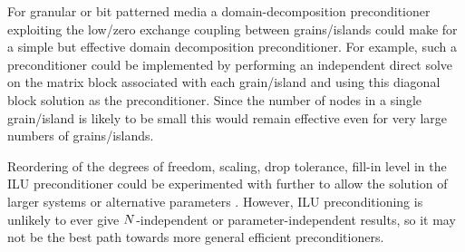 For granular or bit patterned media a domain-decomposition preconditioner exploiting the low/zero exchange coupling between grains/islands could make for a simple but effective domain decomposition preconditioner.
For example, such a preconditioner could be implemented by performing an independent direct solve on the matrix block associated with each grain/island and using this diagonal block solution as the preconditioner.
Since the number of nodes in a single grain/island is likely to be small this would remain effective even for very large numbers of grains/islands.

Reordering of the degrees of freedom, scaling, drop tolerance, fill-in level in the ILU preconditioner could be experimented with further to allow the solution of larger systems or alternative parameters \cite[287]{Saad2000}.
However, ILU preconditioning is unlikely to ever give $N$-independent or parameter-independent results, so it may not be the best path towards more general efficient preconditioners.




